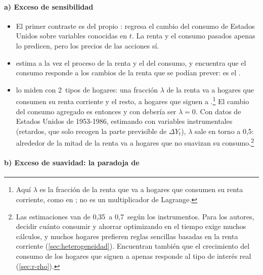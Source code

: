 \documentclass[11pt]{article}
\begin{document}
\paragraph{a) Exceso de sensibilidad}

\begin{itemize}
\item El primer contraste es del propio \textcite{Hall1978}: regresa el cambio del consumo de Estados Unidos sobre variables conocidas en $t$. La renta y el consumo pasados apenas lo predicen, pero los precios de las acciones sí.
\item \textcite{Flavin1981Adjustment} estima a la vez el proceso de la renta y el del consumo, y encuentra que el consumo responde a los cambios de la renta que se podían prever: es el .
\item \textcite{CampbellMankiw1989Consumption} lo miden con 2~tipos de hogares: una fracción $\lambda$ de la renta va a hogares que consumen su renta corriente y el resto, a hogares que siguen a .\footnote{Aquí $\lambda$ es la fracción de la renta que va a hogares que consumen su renta corriente, como en \textcite{CampbellMankiw1989Consumption}; no es un multiplicador de Lagrange.} El cambio del consumo agregado es entonces
  y con  debería ser $\lambda=0$. Con datos de Estados Unidos de 1953-1986, estimando con variables instrumentales (retardos, que solo recogen la parte previsible de $\Delta Y_t$), $\lambda$ sale en torno a 0,5: alrededor de la mitad de la renta va a hogares que no suavizan su consumo.\footnote{Las estimaciones van de 0,35~a 0,7~según los instrumentos. Para los autores, decidir cuánto consumir y ahorrar optimizando en el tiempo exige muchos cálculos, y muchos hogares prefieren reglas sencillas basadas en la renta corriente (\ref{sec:heterogeneidad}). Encuentran también que el crecimiento del consumo de los hogares que siguen a  apenas responde al tipo de interés real (\ref{sec:r-rho}).}
\end{itemize}

\paragraph{b) Exceso de suavidad: la paradoja de }
\end{document}
